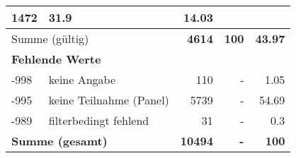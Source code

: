 \begin{longtable}{lXrrr}
       \num{1472} &
       \num[round-mode=places,round-precision=2]{31.9} &
         \num[round-mode=places,round-precision=2]{14.03} \\
     \midrule
     \multicolumn{2}{l}{Summe (gültig)} &
       \textbf{\num{4614}} &
     \textbf{\num{100}} &
       \textbf{\num[round-mode=places,round-precision=2]{43.97}} \\
     \multicolumn{5}{l}{\textbf{Fehlende Werte}}\\
       -998 &
       keine Angabe &
         \num{110} &
        - &
         \num[round-mode=places,round-precision=2]{1.05} \\
       -995 &
       keine Teilnahme (Panel) &
         \num{5739} &
        - &
         \num[round-mode=places,round-precision=2]{54.69} \\
       -989 &
       filterbedingt fehlend &
         \num{31} &
        - &
         \num[round-mode=places,round-precision=2]{0.3} \\
     \midrule
     \multicolumn{2}{l}{\textbf{Summe (gesamt)}} &
          \textbf{\num{10494}} &
        \textbf{-} &
        \textbf{\num{100}} \\
     \bottomrule
     \end{longtable}
     
